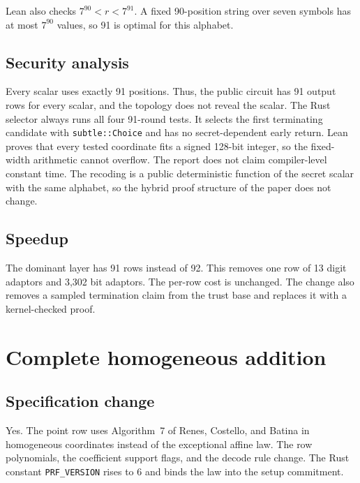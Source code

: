 \documentclass[10pt]{article}
\begin{document}
Lean also checks $7^{90}<r<7^{91}$.
A fixed 90-position string over seven symbols has at most $7^{90}$ values, so 91 is optimal for this alphabet.

\subsection{Security analysis}
Every scalar uses exactly 91 positions.
Thus, the public circuit has 91 output rows for every scalar, and the topology does not reveal the scalar.
The Rust selector always runs all four 91-round tests.
It selects the first terminating candidate with \texttt{subtle::Choice} and has no secret-dependent early return.
Lean proves that every tested coordinate fits a signed 128-bit integer, so the fixed-width arithmetic cannot overflow.
The report does not claim compiler-level constant time.
The recoding is a public deterministic function of the secret scalar with the same alphabet, so the hybrid proof structure of the paper does not change.

\subsection{Speedup}
The dominant layer has 91 rows instead of 92.
This removes one row of 13 digit adaptors and 3,302 bit adaptors.
The per-row cost is unchanged.
The change also removes a sampled termination claim from the trust base and replaces it with a kernel-checked proof.

\section{Complete homogeneous addition}
\label{sec:o3}

\subsection{Specification change}
Yes.
The point row uses Algorithm~7 of Renes, Costello, and Batina in homogeneous coordinates instead of the exceptional affine law.
The row polynomials, the coefficient support flags, and the decode rule change.
The Rust constant \texttt{PRF\_VERSION} rises to 6 and binds the law into the setup commitment.
\end{document}
